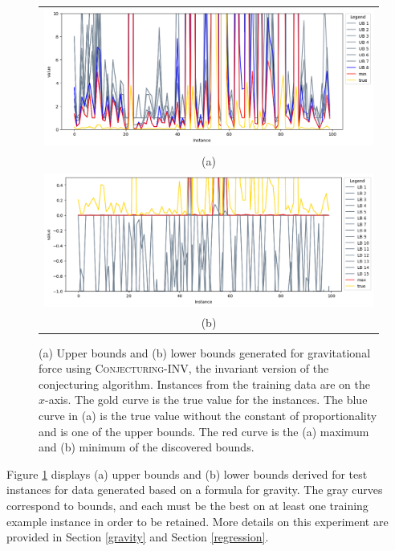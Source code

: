 \documentclass[ijds,nonblindrev]{informs-ijds}
\begin{document}
\begin{figure}
\begin{tabular}{c}
\includegraphics[width=5.0in]{gravity_ub_100_True.png} \\
(a) \\
\includegraphics[width=5.0in]{gravity_lb_100_True.png}\\
(b)
\end{tabular}
\caption{\label{conjecturing_inv}(a) Upper bounds and (b) lower bounds generated for gravitational force using \textsc{Conjecturing-INV}, the invariant version of the conjecturing algorithm.  Instances from the training data are on the $x$-axis.  The gold curve is the true value for the instances. The blue curve in (a) is the true value without the constant of proportionality and is one of the upper bounds.  The red curve is the (a) maximum and (b) minimum of the discovered bounds.} 
\end{figure}


Figure \ref{conjecturing_inv} displays (a) upper bounds and (b) lower bounds derived for test instances for data generated based on a formula for gravity.  The gray curves correspond to bounds, and each must be the best on at least one training example instance in order to be retained.  More details on this experiment are provided in Section \ref{gravity} and Section \ref{regression}.
\end{document}
